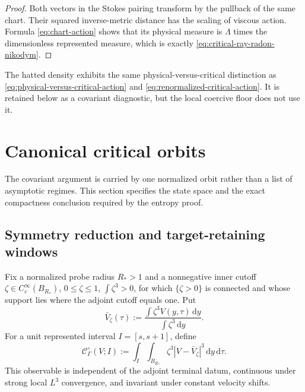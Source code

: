 \documentclass[11pt]{amsart}
\numberwithin{equation}{section}
\theoremstyle{plain}
\theoremstyle{definition}
\theoremstyle{remark}
\newcommand{\dd}{\,\mathrm d}
\newcommand{\OscMass}{\mathcal C^{\circ}}
\begin{document}
\begin{proof}
Both vectors in the Stokes pairing transform by the pullback of the same
chart.  Their squared inverse-metric distance has the scaling of viscous
action.  Formula \eqref{eq:chart-action} shows that its physical measure is
\(\Lambda\) times the dimensionless represented measure, which is exactly
\eqref{eq:critical-ray-radon-nikodym}.
\end{proof}

The hatted density exhibits the same physical-versus-critical distinction as
\eqref{eq:physical-versus-critical-action} and
\eqref{eq:renormalized-critical-action}.  It is retained below as a
covariant diagnostic, but the local coercive floor does not use it.

\section{Canonical critical orbits}
\label{sec:critical-orbit}

The covariant argument is carried by one normalized orbit rather than a list
of asymptotic regimes.  This section specifies the state space and the exact
compactness conclusion required by the entropy proof.

\subsection{Symmetry reduction and target-retaining windows}

Fix a normalized probe radius \(R_*>1\) and a nonnegative inner cutoff
\(\zeta\in C_c^\infty(B_{R_*})\),
\(0\le\zeta\le1\), \(\int\zeta^3>0\), for which
\(\{\zeta>0\}\) is connected and whose support
lies where the adjoint
cutoff equals one.  Put
\begin{equation}\label{eq:fixed-inner-mean}
 \bar V_\zeta(\tau)
 :=\frac{\int\zeta^3V(y,\tau)\dd y}{\int\zeta^3\dd y}.
\end{equation}
For a unit represented interval \(I=[s,s+1]\), define
\begin{equation}\label{eq:oscillatory-mass}
 \OscMass_\Gamma(V;I)
 :=\int_I\int_{B_{R_*}}
       \zeta^3|V-\bar V_\zeta|^3\dd y\dd\tau.
\end{equation}
This observable is independent of the adjoint terminal datum, continuous
under strong local \(L^3\) convergence, and invariant under constant velocity
shifts.
\end{document}
